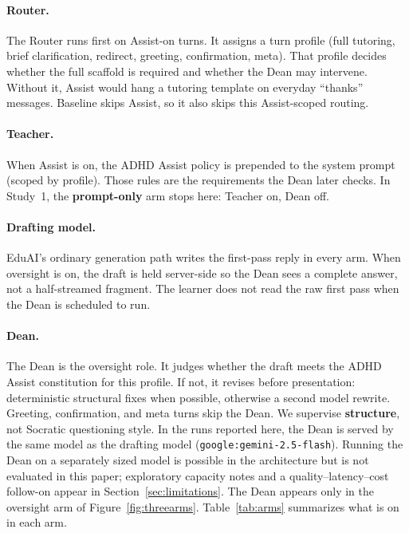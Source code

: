 \paragraph{Router.}
The Router runs first on Assist-on turns. It assigns a turn profile (full
tutoring, brief clarification, redirect, greeting, confirmation, meta). That
profile decides whether the full scaffold is required and whether the Dean may
intervene. Without it, Assist would hang a tutoring template on everyday
``thanks'' messages. Baseline skips Assist, so it also skips this
Assist-scoped routing.

\paragraph{Teacher.}
When Assist is on, the ADHD Assist policy is prepended to the system prompt
(scoped by profile). Those rules are the requirements the Dean later checks.
In Study~1, the \textbf{prompt-only} arm stops here: Teacher on, Dean off.

\paragraph{Drafting model.}
EduAI's ordinary generation path writes the first-pass reply in every arm.
When oversight is on, the draft is held server-side so the Dean sees a
complete answer, not a half-streamed fragment. The learner does not read the
raw first pass when the Dean is scheduled to run.

\paragraph{Dean.}
The Dean is the oversight role. It judges whether the draft meets the ADHD
Assist constitution for this profile. If not, it revises before presentation:
deterministic structural fixes when possible, otherwise a second model
rewrite. Greeting, confirmation, and meta turns skip the Dean. We supervise
\textbf{structure}, not Socratic questioning style. In the runs reported
here, the Dean is served by the same model as the drafting model
(\texttt{google:gemini-2.5-flash}). Running the Dean on a separately sized
model is possible in the architecture but is not evaluated in this paper;
exploratory capacity notes and a quality--latency--cost follow-on appear in
Section~\ref{sec:limitations}. The Dean appears only in the oversight arm of
Figure~\ref{fig:threearms}.
Table~\ref{tab:arms} summarizes what is on in each arm.


